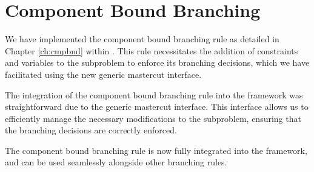 \section{Component Bound Branching}\label{sec:cmpbnd}
We have implemented the component bound branching rule as detailed in Chapter \ref{ch:cmpbnd} within \GCG{}. This rule necessitates the addition of constraints and variables to the subproblem to enforce its branching decisions, which we have facilitated using the new generic mastercut interface.

The integration of the component bound branching rule into the \GCG{} framework was straightforward due to the generic mastercut interface. This interface allows us to efficiently manage the necessary modifications to the subproblem, ensuring that the branching decisions are correctly enforced.

The component bound branching rule is now fully integrated into the \GCG{} framework, and can be used seamlessly alongside other branching rules.
